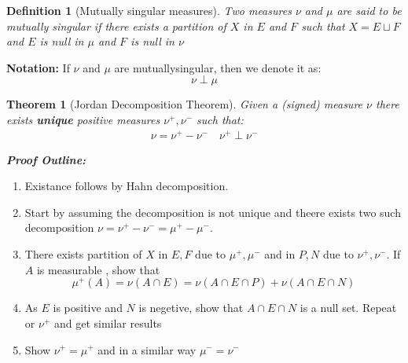 \documentclass[notoc]{tufte-book}
\newtheorem{defn}{Definition}
\newtheorem{theorem}{Theorem}
\begin{document}
\begin{defn}[Mutually singular measures]
Two measures $\nu$ and $\mu$ are said to be mutually singular if there exists a partition of $X$ in $E$ and $F$ such that 	$X=E\sqcup F$ and $E$ is null in $\mu$ and $F$ is null in $\nu$
\end{defn}\noindent
\textbf{Notation: }If $\nu$ and $\mu$ are mutuallysingular, then we denote it as:
$$\nu\perp\mu$$
\begin{theorem}[Jordan Decomposition Theorem]
Given a (signed) measure $\nu$ there exists \textbf{unique} positive measures $\nu^+,\nu^-$ such that:
\begin{align}
	\nu=\nu^+-\nu^-\quad\nu^+\perp\nu^-
\end{align}	
\end{theorem}\noindent
\textbf{\textit{Proof Outline:}}
\begin{enumerate}
	\item Existance follows by Hahn decomposition.
	\item Start by assuming the decomposition is not unique and theere exists two such decomposition $\nu=\nu^+-\nu^-=\mu^+-\mu^-$.
	\item There exists partition of $X$ in $E,F$ due to $\mu^+,\mu^-$ and in $P,N$ due to $\nu^+,\nu^-$. If $A$ is measurable , show that $$\mu^+(A)=\nu (A\cap E)=\nu(A\cap E\cap P)+\nu(A\cap E\cap N)$$
	\item As $E$ is positive and $N$ is negetive, show that $A\cap E\cap N$ is a null set. Repeat or $\nu^+$ and get similar results 
	\item Show $\nu^+=\mu^+$ and in a similar way $\mu^-=\nu^-$
\end{enumerate}
\end{document}
